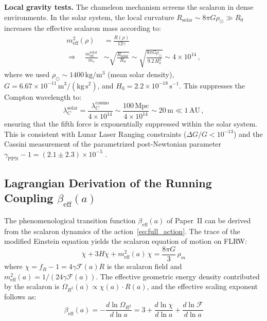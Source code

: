 \documentclass[aps,prd,twocolumn,superscriptaddress,nofootinbib]{revtex4-2}
\begin{document}
\textbf{Local gravity tests.} The chameleon mechanism \cite{Khoury2004} screens the scalaron in dense environments. In the solar system, the local curvature $R_{\mathrm{solar}} \sim 8\pi G\rho_\odot \gg R_0$ increases the effective scalaron mass according to:
\begin{equation}
\begin{split}
m_{\mathrm{eff}}^2(\rho) &= \frac{R(\rho)}{12\gamma} \\
\Rightarrow \quad \frac{m_{\mathrm{eff}}^{\mathrm{solar}}}{m_s} &\sim \sqrt{\frac{R_{\mathrm{solar}}}{R_0}} \sim \sqrt{\frac{8\pi G\rho_\odot}{9.2\,H_0^2}} \sim 4 \times 10^{14}\,,
\end{split}
\end{equation}
where we used $\rho_\odot \sim 1400\,\mathrm{kg/m^3}$ (mean solar density), $G = 6.67 \times 10^{-11}\,\mathrm{m^3/(kg\,s^2)}$, and $H_0 = 2.2 \times 10^{-18}\,\mathrm{s^{-1}}$. This suppresses the Compton wavelength to:
\begin{equation}
\lambda_C^{\mathrm{solar}} = \frac{\lambda_C^{\mathrm{cosmo}}}{4 \times 10^{14}} \sim \frac{100\,\mathrm{Mpc}}{4 \times 10^{14}} \sim 20\,\mathrm{m} \ll 1\,\mathrm{AU}\,,
\end{equation}
ensuring that the fifth force is exponentially suppressed within the solar system. This is consistent with Lunar Laser Ranging constraints ($\Delta G/G < 10^{-13}$) \cite{Williams2004} and the Cassini measurement of the parametrized post-Newtonian parameter $\gamma_{\mathrm{PPN}} - 1 = (2.1 \pm 2.3) \times 10^{-5}$ \cite{Bertotti2003}.

\subsection{Lagrangian Derivation of the Running Coupling $\beta_{\mathrm{eff}}(a)$}
\label{subsec:beta_derivation}

The phenomenological transition function $\beta_{\mathrm{eff}}(a)$ of Paper~II can be derived from the scalaron dynamics of the action~\eqref{eq:full_action}. The trace of the modified Einstein equation yields the scalaron equation of motion on FLRW:
\begin{equation}
\ddot{\chi} + 3H\dot{\chi} + m_{\mathrm{eff}}^2(a)\,\chi = \frac{8\pi G}{3}\,\rho_m
\label{eq:scalaron_eom}
\end{equation}
where $\chi = f_R - 1 = 4\gamma\mathcal{F}(a) R$ is the scalaron field and $m_{\mathrm{eff}}^2(a) = 1/(24\gamma\mathcal{F}(a))$. The effective geometric energy density contributed by the scalaron is $\Omega_{R^2}(a) \propto \chi(a) \cdot R(a)$, and the effective scaling exponent follows as:
\begin{equation}
{\beta_{\mathrm{eff}}(a) = -\frac{d\ln\Omega_{R^2}}{d\ln a} = 3 + \frac{d\ln\chi}{d\ln a} + \frac{d\ln\mathcal{F}}{d\ln a}}
\label{eq:beta_from_lagrangian}
\end{equation}
\end{document}
